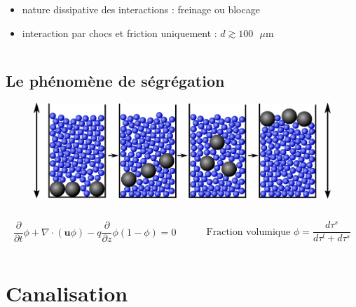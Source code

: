 \documentclass[xcolor=dvipsnames]{beamer}
\newcommand{\p}[2]{\ensuremath{\frac{\partial {#1}}{\partial {#2}}}}
\begin{document}
\begin{frame}
\begin{columns}[t]
\begin{column}{5cm}
\begin{itemize}

\item nature dissipative des interactions : freinage ou blocage

\item interaction par chocs et friction uniquement : $d \gtrsim 100 \text{ } \mu$m
\end{itemize}

  \end{column}
  
 \end{columns}

\end{frame}

\subsection{Le phénomène de ségrégation}
\begin{frame}

\begin{figure}[htp]
\centering
\includegraphics[scale=0.35]{img/brazil.pdf}
\label{}
\end{figure}

\begin{columns}

\begin{column}{6cm}
\[
	\p{}{t} \phi + \nabla \cdot ( \mathbf{u} \phi )  - q \p{}{z} \phi( 1 - \phi) = 0
\]
\end{column}

\begin{column}{6cm}
\[
 \text{Fraction volumique } \phi = \frac{d\tau^s}{d\tau^l + d\tau^s} 
\]
\end{column}

\end{columns}

\end{frame}

\section{Canalisation}
\end{document}
